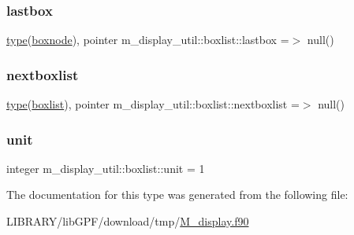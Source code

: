 \mbox{\label{structm__display__util_1_1boxlist_ada85bf1694f8522fa4f401c7e7dd34d3}} 
\subsubsection{\texorpdfstring{lastbox}{lastbox}}
{\footnotesize\ttfamily \hyperlink{stop__watch_83_8txt_a70f0ead91c32e25323c03265aa302c1c}{type}(\hyperlink{structm__display__util_1_1boxnode}{boxnode}), pointer m\+\_\+display\+\_\+util\+::boxlist\+::lastbox =$>$ null()\hspace{0.3cm}{\ttfamily [private]}}

\mbox{\label{structm__display__util_1_1boxlist_a51aeeb63272988f526937af58361c577}} 
\subsubsection{\texorpdfstring{nextboxlist}{nextboxlist}}
{\footnotesize\ttfamily \hyperlink{stop__watch_83_8txt_a70f0ead91c32e25323c03265aa302c1c}{type}(\hyperlink{structm__display__util_1_1boxlist}{boxlist}), pointer m\+\_\+display\+\_\+util\+::boxlist\+::nextboxlist =$>$ null()\hspace{0.3cm}{\ttfamily [private]}}

\mbox{\label{structm__display__util_1_1boxlist_a25d8047955ec4e12f09ff9233ba5c666}} 
\subsubsection{\texorpdfstring{unit}{unit}}
{\footnotesize\ttfamily integer m\+\_\+display\+\_\+util\+::boxlist\+::unit = 1\hspace{0.3cm}{\ttfamily [private]}}



The documentation for this type was generated from the following file\+:\begin{DoxyCompactItemize}
\item 
L\+I\+B\+R\+A\+R\+Y/lib\+G\+P\+F/download/tmp/\hyperlink{M__display_8f90}{M\+\_\+display.\+f90}\end{DoxyCompactItemize}
